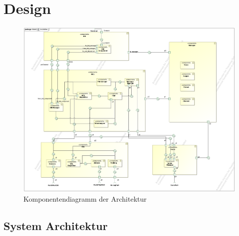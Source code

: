 \documentclass[
   draft=false
  ,paper=a4
  ,twoside=true
  ,fontsize=11pt
  ,headsepline
  ,DIV11
  ,parskip=full+
]{scrartcl} %
\begin{document}
\section{Design} 

\begin{figure}[H]
	\label{fig:nobody}
  	\centering
    \includegraphics [width=\textwidth, angle=90, scale=1.45]{./IMG/Architektur.png}
    \caption[short Name]{Komponentendiagramm der Architektur}
\end{figure}


\subsection{System Architektur}
\end{document}
